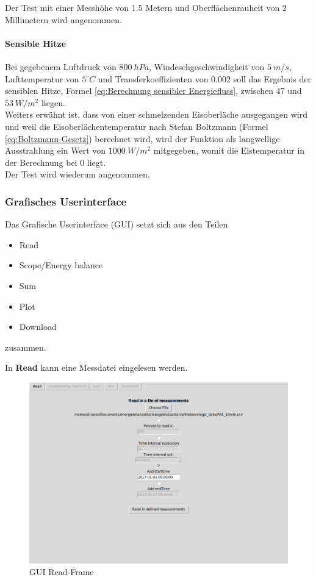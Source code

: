 \documentclass[12pt,a4paper]{article}
\begin{document}
Der Test mit einer Messhöhe von 1.5 Metern und Oberflächenrauheit von 2 Millimetern wird angenommen.

\paragraph{Sensible Hitze}
Bei gegebenem Luftdruck von $800~hPa$, Windeschgeschwindigkeit von $5~m/s$, Lufttemperatur von $5^\circ C$ und Transferkoeffizienten von $0.002$ soll das Ergebnis der sensiblen Hitze, Formel \ref{eq:Berechnung sensibler Energiefluss}, zwischen 47 und $53~W/m^2$ liegen. \\
Weiters erwähnt ist, dass von einer schmelzenden Eisoberläche ausgegangen wird und weil die Eisoberlächentemperatur nach Stefan Boltzmann (Formel \ref{eq:Boltzmann-Gesetz}) berechnet wird, wird der Funktion als langwellige Ausstrahlung ein Wert von $1000~W/m^2$ mitgegeben, womit die Eistemperatur in der Berechnung bei 0 liegt.\\

Der Test wird wiederum angenommen.

\subsubsection{Grafisches Userinterface}
Das Grafische Userinterface (GUI) setzt sich aus den Teilen 
\begin{itemize}
\item Read
\item Scope/Energy balance
\item Sum
\item Plot
\item Download
\end{itemize}
zusammen.

In \textbf{Read} kann eine Messdatei eingelesen werden. 

\begin{figure}[H]
\centering
\includegraphics[width=1\textwidth]{pictures/GUI/Read_Frame.png}
\caption{GUI Read-Frame}
\label{fig:GUI Read-Frame}
\end{figure}
\end{document}
